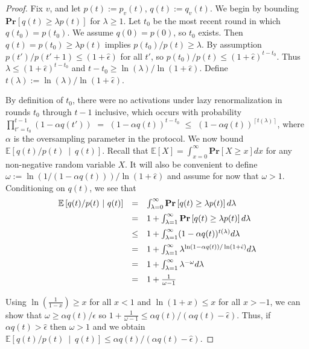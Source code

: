 \documentclass{sig-alternate-dan}
\numberwithin{equation}{section}
\newcommand{\lamexp}{\ensuremath{\omega}} %
\newcommand{\sensor}{\ensuremath{v}}
\newcommand{\paren} [1] {\ensuremath{ \left( {#1} \right) }}
\newcommand{\prob}[1]{\ensuremath{\mathbf{Pr}\left[#1\right] }}
\newcommand{\E}[1]{\ensuremath{\mathbb{E}\left[#1\right] }}
\newcommand{\Econd}[2]{\ensuremath{\mathbb{E}\left[  {#1} \ \middle| \ {#2}\right] }}  %
\newcommand{\ceil}[1]{\ensuremath{\left\lceil#1\right\rceil}}
\begin{document}
{\begin{proof}
Fix $\sensor$, and let $p(t) := p_{\sensor}(t)$, $q(t) := q_{\sensor}(t)$.
We begin by bounding $\prob{q(t) \ge \lambda p(t)}$ for $\lambda \ge
1$.  Let $t_0$ be the most recent round in which $q(t_0) = p(t_0)$.
We assume $q(0) = p(0)$, so $t_0$ exists.
Then $q(t) = p(t_0) \ge \lambda p(t)$  implies $p(t_0)/p(t)
\ge \lambda$.  By assumption $p(t')/p(t'+1) \le (1+\hat{\epsilon})$
for all $t'$, so $p(t_0)/p(t) \le (1+\hat{\epsilon})^{t-t_0}$.
Thus $\lambda \le (1+\hat{\epsilon})^{t-t_0}$ and 
$t-t_0 \ge \ln(\lambda)/ \ln (1+\hat{\epsilon})$. 
Define $t(\lambda) := \ln(\lambda)/ \ln (1+\hat{\epsilon})$.


By definition of $t_0$, there were no activations under lazy renormalization in rounds $t_0$
through $t-1$ inclusive, which occurs with probability 
$\prod_{t' = t_0}^{t-1} (1-\alpha q(t'))$ $=$ $(1-\alpha
q(t))^{t-t_{0}} $ $\le$ $(1-\alpha q(t))^{\ceil{t(\lambda)}}$, where $\alpha$ is the
oversampling parameter in the protocol.  
%
%
We now bound $\Econd{q(t)/p(t)}{q(t)}$.
Recall that $\E{X} = \int_{x = 0}^{\infty} \prob{X \ge x}dx$ for any non-negative
random variable $X$.  It will also be convenient to define 
$\lamexp := \ln(1/(1 - \alpha q(t))) / \ln(1+\hat{\epsilon})$ and assume for now
that $\lamexp > 1$.
Conditioning on $q(t)$, we see that 
\[
\begin{array}{lcl}
 \vspace{2mm}
\Econd{q(t)/p(t)}{q(t)} & = & \int_{\lambda = 0}^{\infty} \prob{q(t) \ge
  \lambda p(t)}d\lambda \\ 
 \vspace{2mm}
  & = & 1 + \int_{\lambda = 1}^{\infty} \prob{q(t) \ge
  \lambda p(t)}d\lambda \\ 
\vspace{2mm}
 & \le & 1 + \int_{\lambda = 1}^{\infty} (1-\alpha q(t))^{t(\lambda)}d\lambda\\
 \vspace{2mm}
 & = & 1 + \int_{\lambda = 1}^{\infty}
\lambda^{\ln(1-\alpha q(t))/\ln(1+\hat{\epsilon}) }d\lambda \\
 \vspace{2mm}
 & = & 1 + \int_{\lambda = 1}^{\infty} \lambda^{-\lamexp}d\lambda \\ 
 \vspace{2mm}
 & = & 1 + \frac{1}{\lamexp - 1}
%
%
\end{array}
\]
Using $\ln\paren{\frac{1}{1-x}} \ge x$ for all $x < 1$ and 
$\ln(1+x) \le x$ for all $x > -1$, we can show that 
%
%
$\lamexp \ge \alpha q(t)/\hat{\epsilon}$
so $1+\frac{1}{\lamexp - 1} \le \alpha
q(t)/(\alpha q(t) - \hat{\epsilon})$.
Thus, if $\alpha q(t) > \hat{\epsilon}$ then $\lamexp > 1$ and we
obtain 
$\Econd{q(t)/p(t)}{q(t)} \le  \alpha q(t)/(\alpha q(t) - \hat{\epsilon})$.



\end{proof}}
\end{document}
